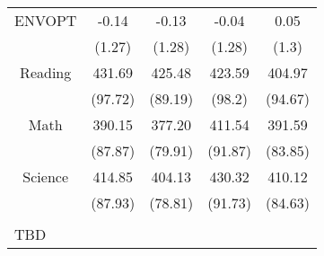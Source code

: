 \begin{table}[!htbp]
\begin{tabular}{@{\extracolsep{5pt}} ccccc}
ENVOPT & -0.14 & -0.13 & -0.04 &  0.05 \\ 
 & (1.27) & (1.28) & (1.28) & (1.3) \\ 
Reading & 431.69 & 425.48 & 423.59 & 404.97 \\ 
 & (97.72) & (89.19) & (98.2) & (94.67) \\ 
Math & 390.15 & 377.20 & 411.54 & 391.59 \\ 
 & (87.87) & (79.91) & (91.87) & (83.85) \\ 
Science & 414.85 & 404.13 & 430.32 & 410.12 \\ 
 & (87.93) & (78.81) & (91.73) & (84.63) \\ 
\hline \\[-1.8ex] 
\multicolumn{5}{l}{TBD} \\ 
\end{tabular} 
\end{table} 
